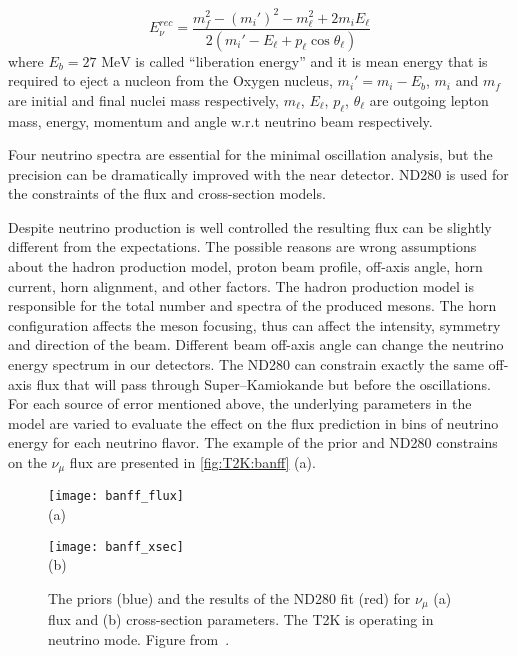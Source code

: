 \documentclass[../main.tex]{subfiles}
\begin{document}
\begin{equation}
\label{eq:t2k:sk_e}
E_\nu^{rec}=\frac{m_f^2-(m_i')^2-m_\ell^2+2m_iE_\ell}{2\left(m_i'-E_\ell+p_\ell\cos\theta_\ell\right)}
\end{equation}
where $E_b = 27\text{ MeV}$ is called ``liberation energy'' and it is mean energy that is required to eject a nucleon from the Oxygen nucleus, $m_i'=m_i-E_b$, $m_i$ and $m_f$ are initial and final nuclei mass respectively, $m_\ell$, $E_\ell$, $p_\ell$, $\theta_\ell$ are outgoing lepton mass, energy, momentum and angle w.r.t neutrino beam respectively.

Four neutrino spectra are essential for the minimal oscillation analysis, but the precision can be dramatically improved with the near detector. ND280 is used for the constraints of the flux and cross-section models.

Despite neutrino production is well controlled the resulting flux can be slightly different from the expectations. The possible reasons are wrong assumptions about the hadron production model, proton beam profile, off-axis angle, horn current, horn alignment, and other factors. The hadron production model is responsible for the total number and spectra of the produced mesons. The horn configuration affects the meson focusing, thus can affect the intensity, symmetry and direction of the beam. Different beam off-axis angle can change the neutrino energy spectrum in our detectors. The ND280 can constrain exactly the same off-axis flux that will pass through Super--Kamiokande but before the oscillations. For each source of error mentioned above, the underlying parameters in the model are varied to evaluate the effect on the flux prediction in bins of neutrino energy for each neutrino flavor. The example of the prior and ND280 constrains on the $\nu_\mu$ flux are presented in \autoref{fig:T2K:banff} (a).

\begin{figure}[!ht]
  \centering
  \begin{minipage}{0.49\linewidth}
    \centering
    \texttt{[image: banff\_flux]} \\ (a)
  \end{minipage}
  \begin{minipage}{0.49\linewidth}
    \centering
    \texttt{[image: banff\_xsec]} \\ (b)
  \end{minipage}
    \caption{The priors (blue) and the results of the ND280 fit (red) for $\nu_\mu$ (a) flux and (b) cross-section parameters. The T2K is operating in neutrino mode. Figure from~\cite{Abe2017}.}
    \label{fig:T2K:banff}
\end{figure}
\end{document}
